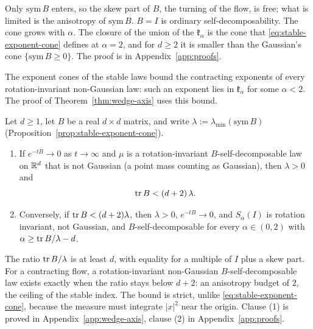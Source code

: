 Only $\mathrm{sym}\,B$ enters, so the skew part of $B$, the turning of the flow, is free; what is
limited is the anisotropy of $\mathrm{sym}\,B$. $B = I$ is ordinary self-decomposability. The cone grows
with $\alpha$. The closure of the union of the $\mathfrak k_\alpha$ is the cone that
\ref{eq:stable-exponent-cone} defines at $\alpha = 2$, and for $d \ge 2$ it is smaller than the
Gaussian's cone $\{\mathrm{sym}\,B \ge 0\}$.
The proof is in Appendix~\ref{app:proofs}.

The exponent cones of the stable laws bound the contracting exponents of every rotation-invariant
non-Gaussian law: such an exponent lies in $\mathfrak k_\alpha$ for some $\alpha < 2$. The proof of
Theorem~\ref{thm:wedge-axis} uses this bound.

\begin{proposition}\label{prop:anisotropy-budget}
Let $d \ge 1$, let $B$ be a real $d \times d$ matrix, and write
$\lambda := \lambda_{\min}(\mathrm{sym}\,B)$ (Proposition~\ref{prop:stable-exponent-cone}).
\begin{enumerate}
\item If $e^{-tB} \to 0$ as $t \to \infty$ and $\mu$ is a rotation-invariant $B$-self-decomposable
law on $\mathbb{R}^d$ that is not Gaussian (a point mass counting as Gaussian), then $\lambda > 0$ and
\[
  \operatorname{tr} B < (d+2)\,\lambda .
\]
\item Conversely, if $\operatorname{tr} B < (d+2)\lambda$, then $\lambda > 0$, $e^{-tB} \to 0$, and $S_\alpha(I)$ is
rotation invariant, not Gaussian, and $B$-self-decomposable for every $\alpha \in (0,2)$ with
$\alpha \ge \operatorname{tr} B/\lambda - d$.
\end{enumerate}
\end{proposition}

The ratio $\operatorname{tr} B/\lambda$ is at least $d$, with equality for a multiple of $I$ plus a skew part. For a
contracting flow, a rotation-invariant non-Gaussian $B$-self-decomposable law exists exactly when the
ratio stays below $d + 2$: an anisotropy budget of $2$, the ceiling of the stable index. The bound is
strict, unlike \ref{eq:stable-exponent-cone}, because the \Levy{} measure must integrate $|x|^2$ near
the origin. Clause (1) is proved in Appendix~\ref{app:wedge-axis}, clause (2) in
Appendix~\ref{app:proofs}.

